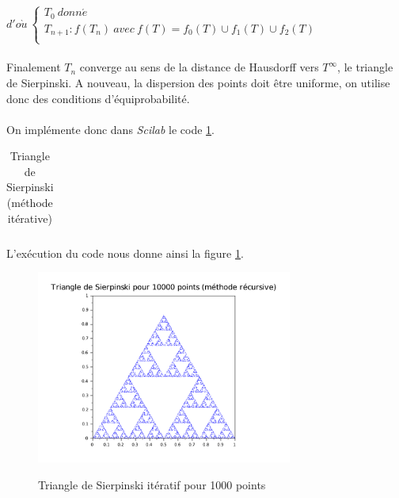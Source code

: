 \documentclass[a4paper,10pt]{report}
\begin{document}
$d'o\grave{u} \
\left\lbrace
\begin{array}{l}
T_0 \ donn\acute{e} \\
T_{n+1} : f(T_n) \ avec \ f(T)=f_0(T)\cup f_1(T)\cup f_2(T)\\
\end{array}\right.$\\ \\
Finalement $T_n$ converge au sens de la distance de Hausdorff vers $T^\infty$, le triangle de Sierpinski. A nouveau, la dispersion des points doit être uniforme, on utilise donc des conditions d'équiprobabilité. \\ \\

\indent On implémente donc dans \textit{Scilab} le code \ref{code_sierpinski_it}.
\begin{table}[H]
\caption{Triangle de Sierpinski (méthode itérative)}
\begin{tabular}{l}
\\
\end{tabular}
\label{code_sierpinski_it}
\end{table}
\newpage
L'exécution du code nous donne ainsi la figure \ref{sierpinski_iteratif}.
\begin{figure}[H]
\centering
\caption{Triangle de Sierpinski itératif pour 1000 points}
\includegraphics[width=0.75\textwidth]{sierpinski_iteratif.pdf}
\label{sierpinski_iteratif}
\end{figure}
\end{document}
